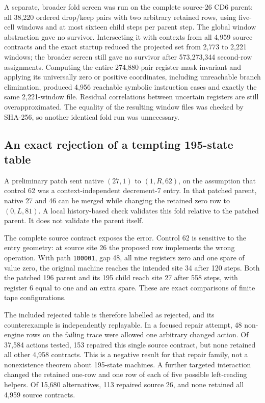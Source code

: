 \documentclass[11pt,a4paper]{article}
\begin{document}
A separate, broader fold screen was run on the complete source-26 CD6
parent: all 38,220 ordered drop/keep pairs with two arbitrary retained
rows, using five-cell windows and at most sixteen child steps per parent
step. The global window abstraction gave no survivor. Intersecting it
with contexts from all 4,959 source contracts and the exact startup
reduced the projected set from 2,773 to 2,221 windows; the broader screen
still gave no survivor after 573,273,344 second-row assignments. Computing
the entire 274,880-pair register-mask invariant and applying its universally
zero or positive coordinates, including unreachable branch elimination,
produced 4,956 reachable symbolic instruction cases
and exactly the same 2,221-window file. Residual correlations between uncertain registers are still overapproximated.
The equality of the resulting window files was checked by SHA-256, so another
identical fold run was unnecessary.

\subsection{An exact rejection of a tempting 195-state table}

A preliminary patch sent native $(27,1)$ to $(1,R,62)$, on the assumption
that control 62 was a context-independent decrement-7 entry. In that
patched parent, native 27 and 46 can be merged while changing the retained
zero row to $(0,L,81)$. A local history-based check validates this fold
relative to the patched parent. It does not validate the parent itself.

The complete source contract exposes the error. Control 62 is sensitive
to the entry geometry: at source site 26 the proposed row implements the
wrong operation. With path \texttt{100001}, gap 48, all nine registers
zero and one spare of value zero, the original machine reaches the intended
site 34 after 120 steps. Both the patched 196 parent and its 195 child
reach site 27 after 558 steps, with register 6 equal to one and an extra
spare. These are exact comparisons of finite tape configurations.

The included rejected table is therefore labelled as rejected, and its
counterexample is independently replayable. In a focused repair attempt,
48 non-engine rows on the failing trace were allowed one arbitrary changed
action. Of 37,584 actions tested, 153 repaired this single source contract,
but none retained all other 4,958 contracts. This is a negative result for
that repair family, not a nonexistence theorem about 195-state machines.
A further targeted interaction changed the retained one-row and one row
of each of five possible left-reading helpers. Of 15,680 alternatives,
113 repaired source 26, and none retained all 4,959 source contracts.
\end{document}

